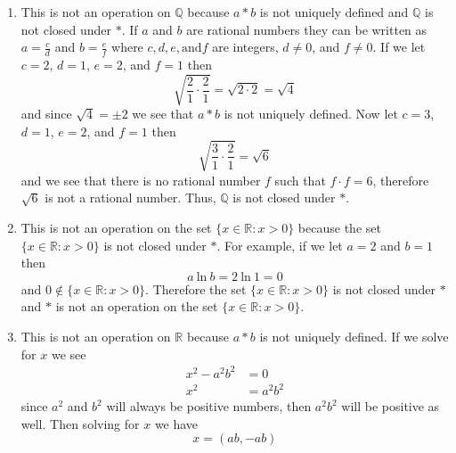 \documentclass[12pt]{article}
\begin{document}
  \begin{enumerate}
    \item This is not an operation on $\mathbb{Q}$ because $a * b$ is not uniquely defined 
      and $\mathbb{Q}$ is not closed under $*$. If $a$ and $b$ are rational numbers they can 
      be written as $a = \frac{c}{d}$ and $b = \frac{e}{f}$ where $c, d, e, \text{and} f$ are 
      integers, $d \neq 0$, and $f \neq 0$. If we let $c = 2$, $d = 1$, $e = 2$, and $f = 1$ then
        \begin{equation*}
          \sqrt{ \frac{2}{1} \cdot \frac{2}{1} } = \sqrt{ 2 \cdot 2 } = \sqrt{4}
        \end{equation*}
      and since $ \sqrt{4} = \pm 2$ we see that $a * b$ is not uniquely defined. Now let $c = 3$, $d = 1$, 
      $e = 2$, and $f = 1$ then
            \begin{equation*}
              \sqrt{ \frac{3}{1} \cdot \frac{2}{1} } = \sqrt{6}
            \end{equation*}	
            and we see that there is no rational number $f$ such that $f \cdot f = 6$, therefore 
            $\sqrt{6}$ is not a rational number. Thus, $\mathbb{Q}$ is not closed under $*$.
          \item This is not an operation on the set $\{x \in \mathbb{R}: x > 0\}$ because the set 
            $\{x \in \mathbb{R}: x > 0\}$ is not closed under $*$. For example, if we let $a = 2$ and $b = 1$ then
            \begin{equation*}
              a~\text{ln}~b = 2~\text{ln}~1 = 0
            \end{equation*}
            and $ 0 \notin \{x \in \mathbb{R}: x > 0\}$. Therefore the set $\{x \in \mathbb{R}: x > 0\}$ 
            is not closed under $*$ and $*$ is not an operation on the set $\{x \in \mathbb{R}: x > 0\}$.
          \item This is not an operation on $\mathbb{R}$ because $a * b$ is not uniquely defined. If we solve for $x$ we see
            \begin{align*}
              x^{2} - a^{2}b^{2} &= 0 \\
              x^{2} &= a^{2}b^{2}
            \end{align*}
            since $a^{2}$ and $b^{2}$ will always be positive numbers, then $a^{2}b^{2}$ will be positive as well. 
            Then solving for $x$ we have
            \begin{equation*}
              x = \left( ab, - ab \right)
            \end{equation*}

\end{enumerate}
\end{document}
